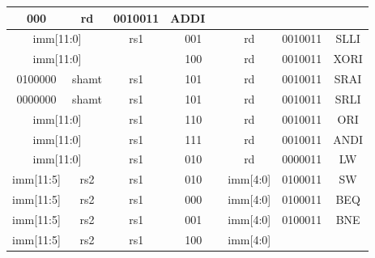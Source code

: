 \documentclass[10pt,letterpaper]{article}
\begin{document}
\begin{table}[H]
\begin{tabular}{|crcrcrcrcrcrc|}
		\multicolumn{2}{c|}{000} &
		\multicolumn{2}{c|}{rd} &
		\multicolumn{2}{c|}{0010011} &
		ADDI \\ \hline
		\multicolumn{4}{|c|}{imm{[}11:0{]}} &
		\multicolumn{2}{c|}{rs1} &
		\multicolumn{2}{c|}{001} &
		\multicolumn{2}{c|}{rd} &
		\multicolumn{2}{c|}{0010011} &
		SLLI \\ \hline
		\multicolumn{4}{|c|}{imm{[}11:0{]}} &
		\multicolumn{2}{c|}{} &
		\multicolumn{2}{c|}{100} &
		\multicolumn{2}{c|}{rd} &
		\multicolumn{2}{c|}{0010011} &
		XORI \\ \hline
		\multicolumn{2}{|c|}{0100000} &
		\multicolumn{2}{c|}{shamt} &
		\multicolumn{2}{c|}{rs1} &
		\multicolumn{2}{c|}{101} &
		\multicolumn{2}{c|}{rd} &
		\multicolumn{2}{c|}{0010011} &
		SRAI \\ \hline
		\multicolumn{2}{|c|}{0000000} &
		\multicolumn{2}{c|}{shamt} &
		\multicolumn{2}{c|}{rs1} &
		\multicolumn{2}{c|}{101} &
		\multicolumn{2}{c|}{rd} &
		\multicolumn{2}{c|}{0010011} &
		SRLI \\ \hline
		\multicolumn{4}{|c|}{imm{[}11:0{]}} &
		\multicolumn{2}{c|}{rs1} &
		\multicolumn{2}{c|}{110} &
		\multicolumn{2}{c|}{rd} &
		\multicolumn{2}{c|}{0010011} &
		ORI \\ \hline
		\multicolumn{4}{|c|}{imm{[}11:0{]}} &
		\multicolumn{2}{c|}{rs1} &
		\multicolumn{2}{c|}{111} &
		\multicolumn{2}{c|}{rd} &
		\multicolumn{2}{c|}{0010011} &
		ANDI \\ \hline
		\multicolumn{4}{|c|}{imm{[}11:0{]}} &
		\multicolumn{2}{c|}{rs1} &
		\multicolumn{2}{c|}{010} &
		\multicolumn{2}{c|}{rd} &
		\multicolumn{2}{c|}{0000011} &
		LW \\ \hline
		\multicolumn{2}{|c|}{imm{[}11:5{]}} &
		\multicolumn{2}{c|}{rs2} &
		\multicolumn{2}{c|}{rs1} &
		\multicolumn{2}{c|}{010} &
		\multicolumn{2}{c|}{imm{[}4:0{]}} &
		\multicolumn{2}{c|}{0100011} &
		SW \\ \hline
		\multicolumn{2}{|c|}{imm{[}11:5{]}} &
		\multicolumn{2}{c|}{rs2} &
		\multicolumn{2}{c|}{rs1} &
		\multicolumn{2}{c|}{000} &
		\multicolumn{2}{c|}{imm{[}4:0{]}} &
		\multicolumn{2}{c|}{0100011} &
		BEQ \\ \hline
		\multicolumn{2}{|c|}{imm{[}11:5{]}} &
		\multicolumn{2}{c|}{rs2} &
		\multicolumn{2}{c|}{rs1} &
		\multicolumn{2}{c|}{001} &
		\multicolumn{2}{c|}{imm{[}4:0{]}} &
		\multicolumn{2}{c|}{0100011} &
		BNE \\ \hline
		\multicolumn{2}{|c|}{imm{[}11:5{]}} &
		\multicolumn{2}{c|}{rs2} &
		\multicolumn{2}{c|}{rs1} &
		\multicolumn{2}{c|}{100} &
		\multicolumn{2}{c|}{imm{[}4:0{]}} &

\end{tabular}
\end{table}
\end{document}
